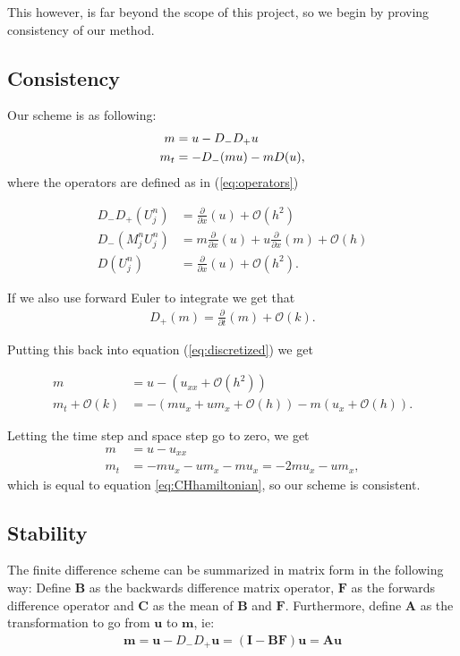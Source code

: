 This however, is far beyond the scope of this project, so we begin by proving consistency of our method.

\subsection*{Consistency}
Our scheme is as following:
\begin{align}
m &= u - D_- D_+ u \notag \\
m_t &=- D_- ( m u ) - m D ( u ),
\label{eq:discretized}
\end{align}
where the operators are defined as in (\ref{eq:operators})

\begin{align*}
D_- D_+ \left( U_j^n \right)  &= \frac{\partial}{\partial x} (u) + \mathcal{O} \left( h^ 2 \right) \\
 D_- \left(M_j^n U_j^n \right) &= m \frac{\partial}{\partial x} (u) + u \frac{\partial}{\partial x} (m) + \mathcal{O} \left( h \right)  \\
D \left(U_j^n \right) &= \frac{\partial}{\partial x} (u) + \mathcal{O} \left( h^2 \right).
\end{align*}

If we also use forward Euler to integrate we get that
\begin{align*}
D_+ (m) =  \frac{\partial}{\partial t} (m) + \mathcal{O}(k).
\end{align*}

Putting this back into equation (\ref{eq:discretized}) we get

\begin{align*}
m &= u - \left( u_{xx} + \mathcal{O}\left(h^2\right) \right) \\
m_t  + \mathcal{O}(k) &= - \left( m u_x + u m_x + \mathcal{O}(h) \right) - m \left( u_x + \mathcal{O}(h) \right).
\end{align*}

Letting the time step and space step go to zero, we get
\begin{align*}
m &= u - u_{xx} \\
m_t &= - m u_x - u m_x - m u_x = - 2m u_x - u m_x,
\end{align*}
which is equal to equation \ref{eq:CHhamiltonian}, so our scheme is consistent. 

\subsection*{Stability}
The finite difference scheme can be summarized in matrix form in the following way:
Define $\bm{B}$ as the backwards difference matrix operator, $\bm{F}$ as the forwards difference operator and $\bm{C}$ as the mean of $\bm{B}$ and $\bm{F}$. Furthermore, define $\bm{A}$ as the transformation to go from $\bm{u}$ to $\bm{m}$, ie:
\begin{align*}
\bm{m} = \bm{u}-D_-D_+\bm{u} = (\bm{I}-\bm{BF})\bm{u} = \bm{A} \bm{u}
\end{align*} 


